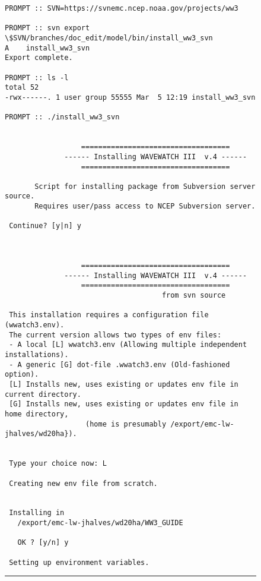\documentclass[12pt]{article}
\newcommand{\botline}{\vspace{1 mm}\rule{152mm}{0.5mm}}
\newcounter{myfigno}[section]
\newenvironment{myfig}[1]{\begin{figure}[#1]
                         \refstepcounter{myfigno}}                       
                        {\end{figure}}
\begin{document}
\begin{myfig}{tbp}
\begin{minipage}[c]{4.5in}
{\scriptsize \begin{verbatim}
PROMPT :: SVN=https://svnemc.ncep.noaa.gov/projects/ww3

PROMPT :: svn export \$SVN/branches/doc_edit/model/bin/install_ww3_svn
A    install_ww3_svn
Export complete.

PROMPT :: ls -l
total 52
-rwx------. 1 user group 55555 Mar  5 12:19 install_ww3_svn

PROMPT :: ./install_ww3_svn


                  ===================================
              ------ Installing WAVEWATCH III  v.4 ------
                  =================================== 

       Script for installing package from Subversion server source. 
       Requires user/pass access to NCEP Subversion server. 

 Continue? [y|n] y



                  ===================================
              ------ Installing WAVEWATCH III  v.4 ------
                  ===================================
                                     from svn source 

 This installation requires a configuration file (wwatch3.env).
 The current version allows two types of env files: 
 - A local [L] wwatch3.env (Allowing multiple independent installations).
 - A generic [G] dot-file .wwatch3.env (Old-fashioned option).
 [L] Installs new, uses existing or updates env file in current directory.
 [G] Installs new, uses existing or updates env file in home directory, 
                   (home is presumably /export/emc-lw-jhalves/wd20ha}).

 
 Type your choice now: L

 Creating new env file from scratch.


 Installing in 
   /export/emc-lw-jhalves/wd20ha/WW3_GUIDE

   OK ? [y/n] y

 Setting up environment variables. 

\end{verbatim}}
\end{minipage}
\botline
\end{myfig}
\end{document}
